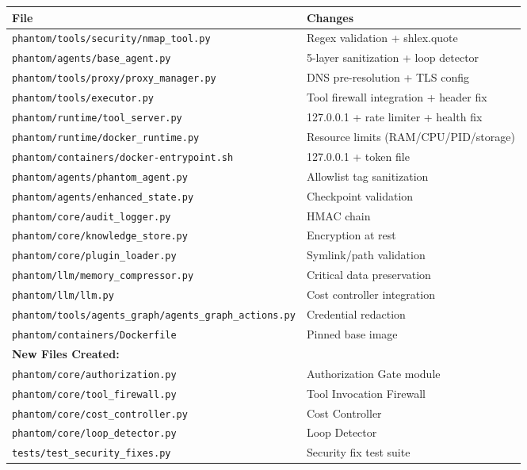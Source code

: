 \documentclass[12pt,a4paper]{article}
\begin{document}
\begin{longtable}{p{7.5cm}p{6cm}}
\toprule
\textbf{File} & \textbf{Changes} \\
\midrule
\endhead
\texttt{phantom/tools/security/nmap\_tool.py} & Regex validation + shlex.quote \\
\texttt{phantom/agents/base\_agent.py} & 5-layer sanitization + loop detector \\
\texttt{phantom/tools/proxy/proxy\_manager.py} & DNS pre-resolution + TLS config \\
\texttt{phantom/tools/executor.py} & Tool firewall integration + header fix \\
\texttt{phantom/runtime/tool\_server.py} & 127.0.0.1 + rate limiter + health fix \\
\texttt{phantom/runtime/docker\_runtime.py} & Resource limits (RAM/CPU/PID/storage) \\
\texttt{phantom/containers/docker-entrypoint.sh} & 127.0.0.1 + token file \\
\texttt{phantom/agents/phantom\_agent.py} & Allowlist tag sanitization \\
\texttt{phantom/agents/enhanced\_state.py} & Checkpoint validation \\
\texttt{phantom/core/audit\_logger.py} & HMAC chain \\
\texttt{phantom/core/knowledge\_store.py} & Encryption at rest \\
\texttt{phantom/core/plugin\_loader.py} & Symlink/path validation \\
\texttt{phantom/llm/memory\_compressor.py} & Critical data preservation \\
\texttt{phantom/llm/llm.py} & Cost controller integration \\
\texttt{phantom/tools/agents\_graph/agents\_graph\_actions.py} & Credential redaction \\
\texttt{phantom/containers/Dockerfile} & Pinned base image \\
\midrule
\multicolumn{2}{l}{\textbf{New Files Created:}} \\
\texttt{phantom/core/authorization.py} & Authorization Gate module \\
\texttt{phantom/core/tool\_firewall.py} & Tool Invocation Firewall \\
\texttt{phantom/core/cost\_controller.py} & Cost Controller \\
\texttt{phantom/core/loop\_detector.py} & Loop Detector \\
\texttt{tests/test\_security\_fixes.py} & Security fix test suite \\
\bottomrule
\end{longtable}
\end{document}
